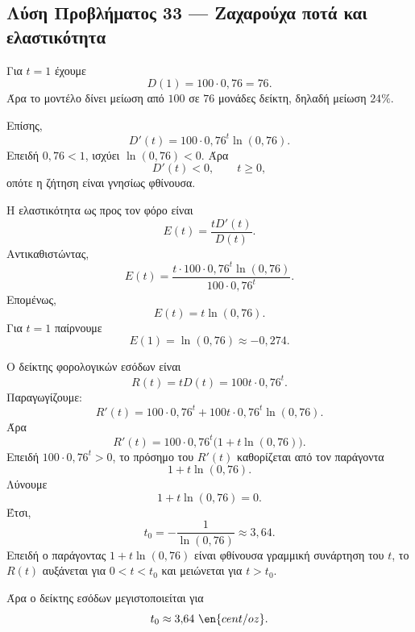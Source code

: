\subsection*{Λύση Προβλήματος 33 --- Ζαχαρούχα ποτά και ελαστικότητα}

\begin{alist}
  \item Για $t=1$ έχουμε
        \[
          D(1)=100\cdot0{,}76=76.
        \]
        Άρα το μοντέλο δίνει μείωση από $100$ σε $76$ μονάδες δείκτη,
        δηλαδή μείωση $24\%$.

        Επίσης,
        \[
          D'(t)=100\cdot0{,}76^t\ln(0{,}76).
        \]
        Επειδή $0{,}76<1$, ισχύει $\ln(0{,}76)<0$. Άρα
        \[
          D'(t)<0,\qquad t\geq0,
        \]
        οπότε η ζήτηση είναι γνησίως φθίνουσα.

  \item Η ελαστικότητα ως προς τον φόρο είναι
        \[
          E(t)=\frac{tD'(t)}{D(t)}.
        \]
        Αντικαθιστώντας,
        \[
          E(t)
          =
          \frac{
            t\cdot100\cdot0{,}76^t\ln(0{,}76)
          }{
            100\cdot0{,}76^t
          }.
        \]
        Επομένως,
        \[
          {E(t)=t\ln(0{,}76)}.
        \]
        Για $t=1$ παίρνουμε
        \[
          {E(1)=\ln(0{,}76)\approx-0{,}274}.
        \]

  \item Ο δείκτης φορολογικών εσόδων είναι
        \[
          R(t)=tD(t)=100t\cdot0{,}76^t.
        \]
        Παραγωγίζουμε:
        \[
          R'(t)=100\cdot0{,}76^t
          +100t\cdot0{,}76^t\ln(0{,}76).
        \]
        Άρα
        \[
          R'(t)=100\cdot0{,}76^t
          \bigl(1+t\ln(0{,}76)\bigr).
        \]
        Επειδή $100\cdot0{,}76^t>0$, το πρόσημο του $R'(t)$
        καθορίζεται από τον παράγοντα
        \[
          1+t\ln(0{,}76).
        \]
        Λύνουμε
        \[
          1+t\ln(0{,}76)=0.
        \]
        Έτσι,
        \[
          t_0=-\frac{1}{\ln(0{,}76)}
          \approx3{,}64.
        \]
        Επειδή ο παράγοντας $1+t\ln(0{,}76)$ είναι φθίνουσα γραμμική
        συνάρτηση του $t$, το $R(t)$ αυξάνεται για
        $0<t<t_0$ και μειώνεται για $t>t_0$.

        Άρα ο δείκτης εσόδων μεγιστοποιείται για
        \[
          {t_0\approx3{,}64\ \en{cent/oz}}.
        \]
\end{alist}
